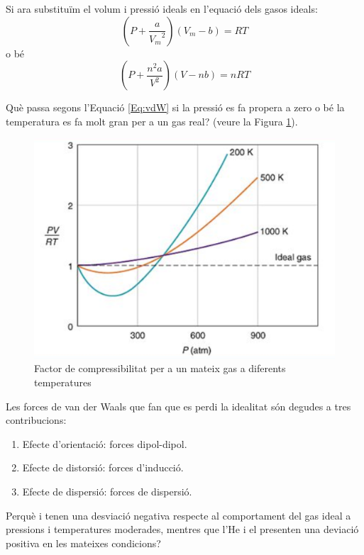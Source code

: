 Si ara substituïm el volum i pressió ideals en l'equació dels gasos ideals:
\[
\left( P + \frac{a}{{V_m}^2} \right) (V_m -b)=RT
\]
o bé
\begin{equation}
\left( P + \frac{n^2 a}{V^2} \right) (V -nb)=nRT
\label{Eq:vdW}
\end{equation}

\begin{exr}
Què passa segons l'Equació \ref{Eq:vdW} si la pressió es fa propera a zero o bé la temperatura es fa molt gran per a un gas real? (veure la Figura \ref{fig:FactorCompressT}).
\end{exr}

\begin{figure}[h]
\centering
\includegraphics[scale=1.0]{figures/FactorCompressT.png}
\caption{Factor de compressibilitat per a un mateix gas a diferents temperatures}
\label{fig:FactorCompressT}
\end{figure}

Les forces de van der Waals que fan que es perdi la idealitat són degudes a tres contribucions:
\begin{enumerate}
\item Efecte d'orientació: forces dipol-dipol.
\item Efecte de distorsió: forces d'inducció.
\item Efecte de dispersió: forces de dispersió.
\end{enumerate}

\begin{exr}
Perquè  i  tenen una desviació negativa respecte al comportament del gas ideal a pressions i temperatures moderades, mentres que l'He i el  presenten una deviació positiva en les mateixes condicions?
\end{exr}


